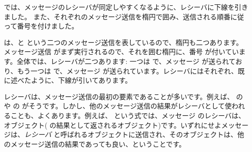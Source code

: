 \documentclass[a4paper,10pt,twoside]{book}
\begin{document}


 では、メッセージのレシーバが同定しやすくなるように、レシーバに下線を引きました。
また、それぞれのメッセージ送信を楕円で囲み、送信される順番に従って番号を付けました。


 は、と  という二つのメッセージ送信を表しているので、楕円も二つあります。メッセージ送信  がまず実行されるので、それを囲む楕円に、番号  が付いています。全体では、レシーバが二つあります: 一つは  で、メッセージ  が送られており、もう一つは  で、メッセージ  が送られています。レシーバにはそれぞれ、既に述べたように、下線が引いてあります。

レシーバは、メッセージ送信の最初の要素であることが多いです。例えば、 の  や  の  がそうです。しかし、他のメッセージ送信の結果がレシーバとして使われることも、よくあります。例えば、 という式では、メッセージ  のレシーバは、 オブジェクト( の結果として返されるオブジェクト)です。いずれにせよメッセージは、\emph{レシーバ} と呼ばれるオブジェクトに送信され、そのオブジェクトは、他のメッセージ送信の結果であっても良い、ということです。
\end{document}
